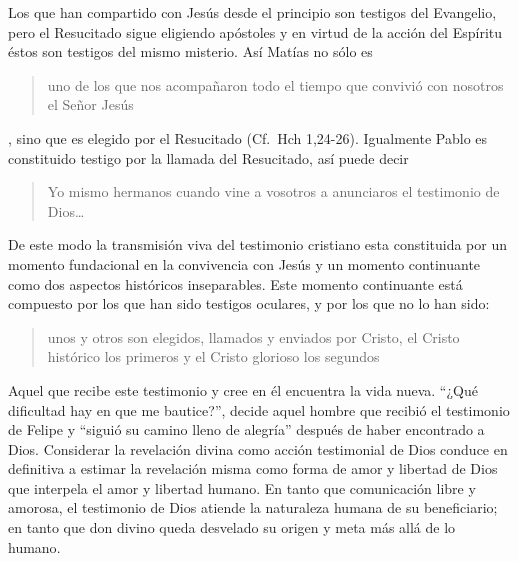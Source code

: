 Los que han compartido con Jesús desde el principio son testigos del Evangelio, pero el Resucitado sigue eligiendo apóstoles y en virtud de la acción del Espíritu éstos son testigos del mismo misterio\autocite[Cf.~][576]{ninot2009tf}. Así Matías no sólo es \blockquote[][\,(Hch 1,21)]{uno de los que nos acompañaron todo el tiempo que convivió con nosotros el Señor Jesús}, sino que es elegido por el Resucitado (Cf.~Hch 1,24-26). Igualmente Pablo es constituido testigo por la llamada del Resucitado, así puede decir \blockquote[][\,(1Cor 2,1)]{Yo mismo hermanos cuando vine a vosotros a anunciaros el testimonio de Dios\ldots}. De este modo la transmisión viva del testimonio cristiano esta constituida por un momento fundacional en la convivencia con Jesús y un momento continuante como dos aspectos históricos inseparables.\autocite[Cf.~][148]{prades2015testimonio} Este momento continuante está compuesto por los que han sido testigos oculares, y por los que no lo han sido: \blockquote[{\cite[148]{prades2015testimonio}}]{unos y otros son elegidos, llamados y enviados por Cristo, el Cristo histórico los primeros y el Cristo glorioso los segundos}. Aquel que recibe este testimonio y cree en él encuentra la vida nueva. ``¿Qué dificultad hay en que me bautice?'', decide aquel hombre que recibió el testimonio de Felipe y ``siguió su camino lleno de alegría'' después de haber encontrado a Dios. Considerar la revelación divina como acción testimonial de Dios conduce en definitiva a estimar la revelación misma como forma de amor y libertad de Dios que interpela el amor y libertad humano. En tanto que comunicación libre y amorosa, el testimonio de Dios atiende la naturaleza humana de su beneficiario; en tanto que don divino queda desvelado su origen y meta más allá de lo humano\autocite[Cf.][152]{prades2015testimonio}.
